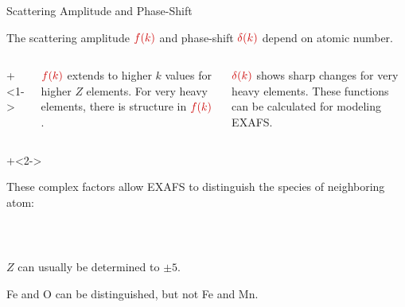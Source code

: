 

\begin{slide}{Scattering Amplitude and Phase-Shift}

      \vmm
    \begin{cenpage}{125mm}
  
  The scattering amplitude ${\Red{f(k)}}$ and phase-shift
  ${{\Red{\delta(k)}}}$ depend on atomic number.

  \vmm

    \begin{columns}
      \onslide+<1->
      \begin{column}{60mm}   

        ${{\Red{f(k)}}}$ extends to higher ${k}$ values for higher $Z$
        elements.  For very heavy elements, there is structure in
        ${{\Red{f(k)}}}$.

      \end{column}
      \begin{column}{60mm}   
        
        ${{\Red{\bdelta(k)}}}$ shows sharp changes for very heavy elements.
        These functions can be calculated  for modeling EXAFS.
      \end{column}

    \end{columns}

\vmm \vmm\vmm

\onslide+<2->

    These complex factors allow EXAFS to distinguish the species of
    neighboring atom:

\begin{columns}
\begin{column}{90mm}{\ }

      \begin{postitbox}{70mm}
        ${Z}$ can usually be determined to $\pm 5$.

        Fe and O can be  distinguished, but not Fe and Mn.
      \end{postitbox}
\end{column}

\end{columns}

\end{cenpage}
  \vfill
\end{slide}

